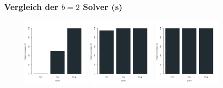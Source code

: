 \documentclass{beamer}
\begin{document}
\begin{frame}
\frametitle{Vergleich der $b = 2$ Solver (s)}

\begin{figure}
\centering
\includegraphics[width=0.3\textwidth]{images/solver_instance_coverage_b=2_s_1s.png}
\includegraphics[width=0.3\textwidth]{images/solver_instance_coverage_b=2_s_3s.png}
\includegraphics[width=0.3\textwidth]{images/solver_instance_coverage_b=2_s_5s.png}
\caption*{\textsc{Zeitlimit} $1s$ $\quad\quad\quad\thinspace\thinspace\thinspace\thinspace\thinspace$ \textsc{Zeitlimit} $3s$
$\thinspace\thinspace\thinspace\thinspace\thinspace\quad\quad\quad$ \textsc{Zeitlimit} $5s$}
\begin{subfigure}[b]{0.3\textwidth}
\centering
{}
\end{subfigure}
\end{figure}
\end{frame}
\end{document}
